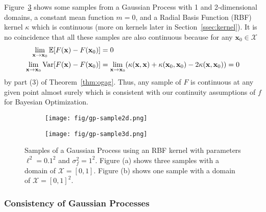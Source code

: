 Figure~\ref{fig:gp-sample} shows some samples from a Gaussian Process with 1 and 2-dimensional domains,
a constant mean function $m = 0$, and a Radial Basis Function (RBF) kernel $\kappa$ which is continuous (more on kernels later in Section~\ref{ssec:kernel}).
It is no coincidence that all these samples are also continuous because for any $\mathbf{x}_0 \in \mathcal{X}$
\begin{align*}
    \lim_{\mathbf{x} \to \mathbf{x}_0 }\mathbb{E}[F(\mathbf{x}) - F(\mathbf{x}_0)] &= 0 \\
    \lim_{\mathbf{x} \to \mathbf{x}_0 }\operatorname{Var}[F(\mathbf{x}) - F(\mathbf{x}_0)] &=
    \lim_{\mathbf{x} \to \mathbf{x}_0} (\kappa(\mathbf{x}, \mathbf{x}) + \kappa(\mathbf{x}_0, \mathbf{x}_0) - 2\kappa(\mathbf{x}, \mathbf{x}_0))
    = 0
\end{align*}
by part (3) of Theorem~\ref{thm:ogag}.
Thus, any sample of $F$ is continuous at any given point almost surely which is consistent with our continuity assumptions of $f$ for Bayesian Optimization.

\begin{figure}
    \centering
    \begin{subfigure}[b]{0.45\textwidth}
        \centering
        \texttt{[image: fig/gp-sample2d.png]}
        \caption{}
        \label{subfig:2d-gp-sample}
    \end{subfigure}
    \hfill
    \begin{subfigure}[b]{0.45\textwidth}
        \centering
        \texttt{[image: fig/gp-sample3d.png]}
        \caption{}
        \label{subfig:3d-gp-sample}
    \end{subfigure}
    \hfill
    \caption{Samples of a Gaussian Process using an RBF kernel with parameters $\ell^{2} = 0.1^2$ and $\sigma^{2}_f = 1 ^ 2$.
    Figure (a) shows three samples with a domain of $\mathcal{X} = [0, 1]$.
    Figure (b) shows one sample with a domain of $\mathcal{X} = [0, 1]^2$.
    }
    \label{fig:gp-sample}
\end{figure}

\subsubsection{Consistency of Gaussian Processes}

